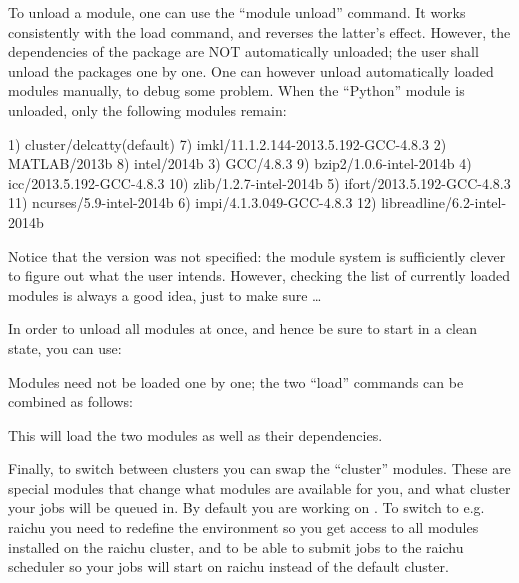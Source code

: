 To unload a module, one can use the ``module unload'' command. It works
consistently with the load command, and reverses the latter's effect. However,
the dependencies of the package are NOT automatically unloaded; the user shall
unload the packages one by one. One can however unload automatically loaded
modules manually, to debug some problem. When the ``Python'' module is unloaded,
only the following modules remain:

\begin{prompt}
  1) cluster/delcatty(default)              7) imkl/11.1.2.144-2013.5.192-GCC-4.8.3
  2) MATLAB/2013b                           8) intel/2014b
  3) GCC/4.8.3                              9) bzip2/1.0.6-intel-2014b
  4) icc/2013.5.192-GCC-4.8.3              10) zlib/1.2.7-intel-2014b
  5) ifort/2013.5.192-GCC-4.8.3            11) ncurses/5.9-intel-2014b
  6) impi/4.1.3.049-GCC-4.8.3              12) libreadline/6.2-intel-2014b
\end{prompt}

Notice that the version was not specified: the module system is sufficiently
clever to figure out what the user intends. However, checking the list of
currently loaded modules is always a good idea, just to make sure \ldots

In order to unload all modules at once, and hence be sure to start in a clean
state, you can use:

\begin{prompt}
\end{prompt}


Modules need not be loaded one by one; the two ``load'' commands can be
combined as follows:

\begin{prompt}
\end{prompt}

This will load the two modules as well as their dependencies.

\ifgent
Finally, to switch between clusters you can swap the ``cluster'' modules.
These are special modules that change what modules are available for you,
and what cluster your jobs will be queued in.
By default you are working on \hpcname. To switch to e.g. raichu you need
to redefine the environment so you get access to all modules installed on
the raichu cluster, and to be able to submit jobs to the raichu scheduler
so your jobs will start on raichu instead of the default \hpcname cluster.

